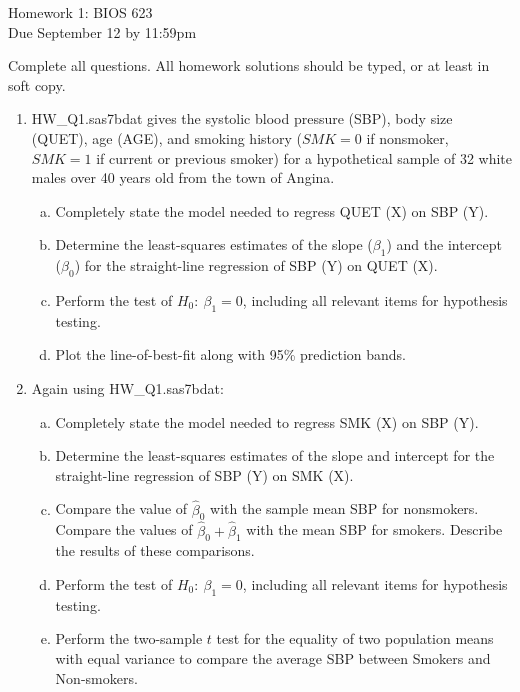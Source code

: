 \documentclass{article}
\begin{document}
\begin{center}
{\large Homework 1: BIOS 623}\\
{\large Due September 12 by 11:59pm}
\end{center}

Complete all questions.  All homework solutions should be typed, or at least in soft copy. \\


\begin{enumerate}[Q 1.]
\item HW\_Q1.sas7bdat gives the systolic blood pressure (SBP), body size (QUET), age (AGE), and smoking history ($SMK =0$ if nonsmoker, $SMK=1$ if current or previous smoker) for a hypothetical sample of 32 white males over 40 years old from the town of Angina.
	\begin{enumerate}[a)]
	\item Completely state the model needed to regress QUET (X) on SBP (Y).
	\item Determine the least-squares estimates of the slope ($\beta_1$) and the intercept ($\beta_0$) for the straight-line regression of SBP (Y) on QUET (X).
	\item Perform the test of $H_0:~\beta_1 = 0$, including all relevant items for hypothesis testing.
	\item Plot the line-of-best-fit along with 95\% prediction bands.
	\end{enumerate}
\item Again using HW\_Q1.sas7bdat:
	\begin{enumerate}[a)]
	\item Completely state the model needed to regress SMK (X) on SBP (Y).
	\item Determine the least-squares estimates of the slope and intercept for the straight-line regression of SBP (Y) on SMK (X).
	\item Compare the value of $\hat\beta_0$ with the sample mean SBP for nonsmokers.  Compare the values of $\hat\beta_0 + \hat\beta_1$ with the mean SBP for smokers.  Describe the results of these comparisons.
	\item Perform the test of $H_0:~\beta_1 = 0$, including all relevant items for hypothesis testing.
	\item Perform the two-sample $t$ test for the equality of two population means with equal variance to compare the average SBP between Smokers and Non-smokers. 

\end{enumerate}
\end{enumerate}
\end{document}

